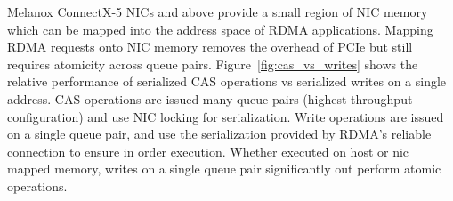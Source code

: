 %
%
%

Melanox ConnectX-5 NICs and above provide a small region of NIC memory which can
be mapped into the address space of RDMA applications.  Mapping RDMA requests
onto NIC memory removes the overhead of PCIe but still requires atomicity across
queue pairs. Figure~\ref{fig:cas_vs_writes} shows the relative performance of
serialized CAS operations vs serialized writes on a single address. CAS
operations are issued many queue pairs (highest throughput configuration) and
use NIC locking for serialization. Write operations are issued on a single queue
pair, and use the serialization provided by RDMA's reliable connection to ensure
in order execution. Whether executed on host or nic mapped memory, writes on a
single queue pair significantly out perform atomic operations.




